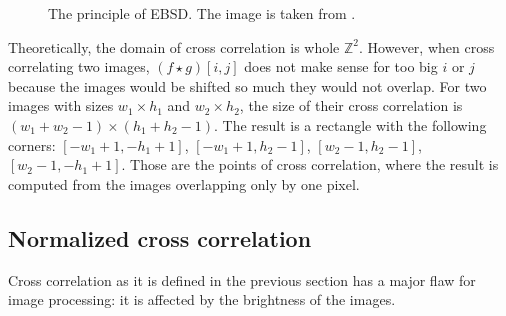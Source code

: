 \begin{figure}
	\caption{The principle of EBSD. The image is taken from \cite{correlation_example}.}
	\label{2d-correlation-example}
\end{figure}

Theoretically, the domain of cross correlation is whole $\mathbb{Z}^2$. However, when cross correlating two images, $(f \star g)[i,j]$ does not make sense for too big $i$ or $j$ because the images would be shifted so much they would not overlap. For two images with sizes $w_1 \times h_1$ and $w_2 \times h_2$, the size of their cross correlation is $(w_1 + w_2 - 1) \times (h_1 + h_2 - 1)$. The result is a rectangle with the following corners: $[-w_1+1,-h_1+1]$, $[-w_1+1,h_2-1]$, $[w_2-1,h_2-1]$, $[w_2-1,-h_1+1]$. Those are the points of cross correlation, where the result is computed from the images overlapping only by one pixel.

\subsection{Normalized cross correlation}

Cross correlation as it is defined in the previous section has a major flaw for image processing: it is affected by the brightness of the images.


